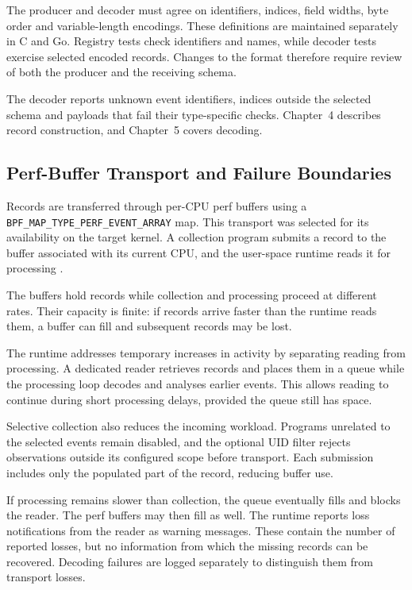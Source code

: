   The producer and decoder must agree on identifiers, indices, field widths,
  byte order and variable-length encodings. These definitions are maintained
  separately in C and Go. Registry tests check identifiers and names, while
  decoder tests exercise selected encoded records. Changes to the format
  therefore require review of both the producer and the receiving schema.

  The decoder reports unknown event identifiers, indices outside the selected
  schema and payloads that fail their type-specific checks. Chapter~4 describes 
  record construction, and Chapter~5 covers decoding.

  \subsection{Perf-Buffer Transport and Failure Boundaries}
  \label{subsec:perf-buffer-failure-boundaries}

  Records are transferred through per-CPU perf buffers using a \\
  \texttt{BPF\_MAP\_TYPE\_PERF\_EVENT\_ARRAY} map. This transport was selected
  for its availability on the target kernel. A collection program submits
  a record to the buffer associated with its current CPU, and the user-space
  runtime reads it for processing \cite{linux_perf_ring_buffer}.

  The buffers hold records while collection and processing proceed at
  different rates. Their capacity is finite: if records arrive faster than
  the runtime reads them, a buffer can fill and subsequent records may be
  lost.
  
  The runtime addresses temporary increases in activity by separating reading
  from processing. A dedicated reader retrieves records and places them in
  a queue while the processing loop decodes and analyses earlier events.
  This allows reading to continue during short processing delays, provided
  the queue still has space.

  Selective collection also reduces the incoming workload. Programs unrelated
  to the selected events remain disabled, and the optional UID filter rejects
  observations outside its configured scope before transport. Each submission
  includes only the populated part of the record, reducing buffer use.

  If processing remains slower than collection, the queue eventually fills
  and blocks the reader. The perf buffers may then fill as well.
  The runtime reports loss notifications from the reader as warning messages.
  These contain the number of reported losses, but no information from which
  the missing records can be recovered. Decoding failures are logged separately
  to distinguish them from transport losses.

